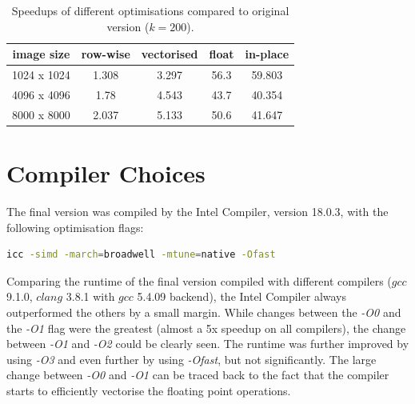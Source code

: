 \documentclass[letterpaper,twocolumn,10pt]{article}
\begin{document}





\begin{table}[ht]
	\vspace{-0.2in}
	\caption{Speedups of different optimisations compared to original version ($k=200$).}
	\begin{tabular}{c c c c c}
		image size  & row-wise & vectorised & float & in-place \\
		 \hline
		1024 x 1024 &  1.308 & 3.297 & 56.3 & 59.803 \\
		4096 x 4096 &  1.78  & 4.543 & 43.7 & 40.354 \\
		8000 x 8000 &  2.037 & 5.133 & 50.6 & 41.647 \\
	\end{tabular}
	\label{tab:veccomp}
	\vspace{-0.35in}
\end{table}


\section*{Compiler Choices}
\vspace{-0.1in}
The final version was compiled by the Intel Compiler, version 18.0.3, with the following optimisation flags:
{\small
\begin{lstlisting}[language=bash]
icc -simd -march=broadwell -mtune=native -Ofast 
\end{lstlisting}}


Comparing the runtime of the final version compiled with different compilers ($gcc$ 9.1.0, $clang$ 3.8.1 with $gcc$ 5.4.09 backend), the Intel Compiler always outperformed the others by a small margin. While changes between the \textit{-O0} and the \textit{-O1} flag were the greatest (almost a 5x speedup on all compilers), the change between \textit{-O1} and \textit{-O2} could be clearly seen. The runtime was further improved by using \textit{-O3} and even further by using \textit{-Ofast}, but not significantly.
The large change between \textit{-O0} and \textit{-O1} can be traced back to the fact that the compiler starts to efficiently vectorise the floating point operations.

\vspace{-0.1in}
\end{document}
